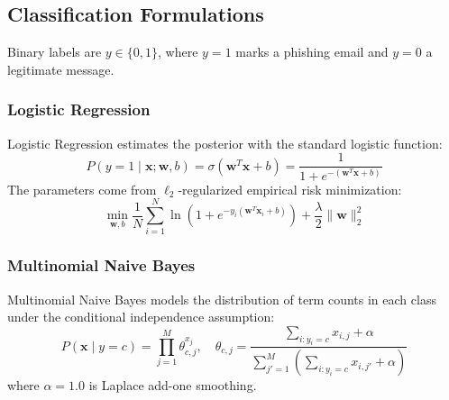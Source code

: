 \documentclass[conference]{IEEEtran}
\begin{document}
\subsection{Classification Formulations}
Binary labels are $y \in \{0, 1\}$, where $y=1$ marks a phishing email and $y=0$ a legitimate message.

\subsubsection{Logistic Regression}
Logistic Regression estimates the posterior with the standard logistic function:
\begin{equation}
P(y=1 \mid \mathbf{x}; \mathbf{w}, b) = \sigma(\mathbf{w}^T \mathbf{x} + b) = \frac{1}{1 + e^{-(\mathbf{w}^T \mathbf{x} + b)}}
\end{equation}
The parameters come from $\ell_2$-regularized empirical risk minimization:
\begin{equation}
\min_{\mathbf{w}, b} \frac{1}{N} \sum_{i=1}^N \ln\left(1 + e^{-y_i(\mathbf{w}^T \mathbf{x}_i + b)}\right) + \frac{\lambda}{2} \|\mathbf{w}\|_2^2
\end{equation}

\subsubsection{Multinomial Naive Bayes}
Multinomial Naive Bayes models the distribution of term counts in each class under the conditional independence assumption:
\begin{equation}
P(\mathbf{x} \mid y=c) = \prod_{j=1}^M \theta_{c,j}^{x_j}, \quad \theta_{c,j} = \frac{\sum_{i: y_i=c} x_{i,j} + \alpha}{\sum_{j'=1}^M \left(\sum_{i: y_i=c} x_{i,j'} + \alpha\right)}
\end{equation}
where $\alpha=1.0$ is Laplace add-one smoothing.
\end{document}
